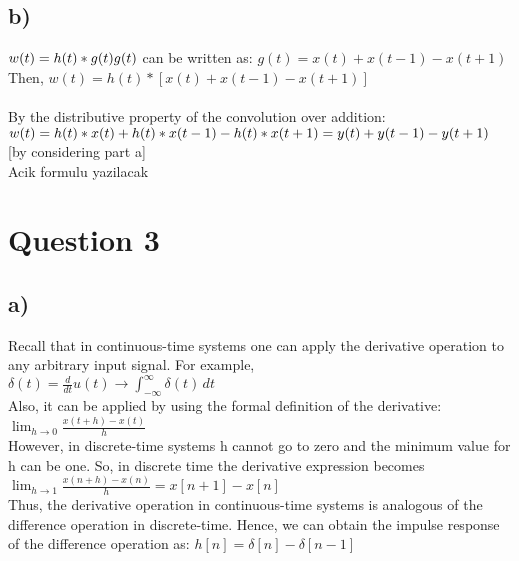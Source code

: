 \documentclass[12pt]{article}
\begin{document}
    \subsection*{b)} \begin{math}
    w(t) = h(t)*g(t) \\ 
    g(t)\end{math} can be written as: \begin{math} g(t) = x(t) + x(t-1) - x(t+1) \end{math} \\
    Then, \begin{math} w(t) = h(t)*[x(t) + x(t-1) - x(t+1)] \end{math} \\ \\
    By the distributive property of the convolution over addition: \\
    \begin{math} w(t) = h(t)*x(t) + h(t)*x(t-1) - h(t)*x(t+1)\\
    = y(t) + y(t-1) - y(t+1) \end{math} [by considering part a] \\
   Acik formulu yazilacak \\  
				   	 
    \section*{Question 3}
    \subsection*{a)}
    Recall that in continuous-time systems one can apply the derivative
    operation to any arbitrary input signal. For example,\\
    \begin{math}
      \delta(t) = \frac{d}{dt}u(t)\longrightarrow \int_{-\infty }^{\infty }  \delta(t)\,dt 
    \end{math}\\
    Also, it can be applied by using the formal definition of the derivative:\\
    \begin{math}
      \lim_{h \to 0} \frac{x(t+h)-x(t)}{h} 
    \end{math}\\
    However, in discrete-time systems h cannot go to zero and the minimum
    value for h can be one. So, in discrete time the derivative expression becomes\\
    \begin{math}
      \lim_{h \to 1} \frac{x(n+h)-x(n)}{h} = x[n+1]-x[n] 
    \end{math}\\
    Thus, the derivative operation in continuous-time systems is analogous of
    the difference operation in discrete-time. Hence, we can obtain the impulse
    response of the difference operation as: \(h[n] = \delta[n] - \delta[n-1]\)
\end{document}
